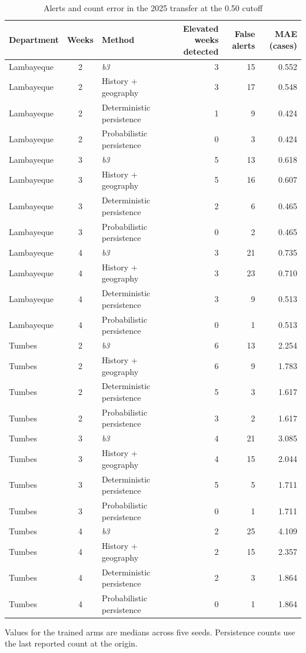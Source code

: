 \documentclass[10pt]{article}
\newcommand{\bthree}{\textit{b3}}
\begin{document}
\begin{table}[!h]
\centering
\caption{Alerts and count error in the 2025 transfer at the 0.50 cutoff}
\small
\begin{tabular}{@{}lclrrr@{}}
\toprule
Department & Weeks & Method & Elevated weeks detected & False alerts & MAE (cases)\\
\midrule
Lambayeque & 2 & \bthree{} & 3 & 15 & 0.552\\
Lambayeque & 2 & History + geography & 3 & 17 & 0.548\\
Lambayeque & 2 & Deterministic persistence & 1 & 9 & 0.424\\
Lambayeque & 2 & Probabilistic persistence & 0 & 3 & 0.424\\
Lambayeque & 3 & \bthree{} & 5 & 13 & 0.618\\
Lambayeque & 3 & History + geography & 5 & 16 & 0.607\\
Lambayeque & 3 & Deterministic persistence & 2 & 6 & 0.465\\
Lambayeque & 3 & Probabilistic persistence & 0 & 2 & 0.465\\
Lambayeque & 4 & \bthree{} & 3 & 21 & 0.735\\
Lambayeque & 4 & History + geography & 3 & 23 & 0.710\\
Lambayeque & 4 & Deterministic persistence & 3 & 9 & 0.513\\
Lambayeque & 4 & Probabilistic persistence & 0 & 1 & 0.513\\
Tumbes & 2 & \bthree{} & 6 & 13 & 2.254\\
Tumbes & 2 & History + geography & 6 & 9 & 1.783\\
Tumbes & 2 & Deterministic persistence & 5 & 3 & 1.617\\
Tumbes & 2 & Probabilistic persistence & 3 & 2 & 1.617\\
Tumbes & 3 & \bthree{} & 4 & 21 & 3.085\\
Tumbes & 3 & History + geography & 4 & 15 & 2.044\\
Tumbes & 3 & Deterministic persistence & 5 & 5 & 1.711\\
Tumbes & 3 & Probabilistic persistence & 0 & 1 & 1.711\\
Tumbes & 4 & \bthree{} & 2 & 25 & 4.109\\
Tumbes & 4 & History + geography & 2 & 15 & 2.357\\
Tumbes & 4 & Deterministic persistence & 2 & 3 & 1.864\\
Tumbes & 4 & Probabilistic persistence & 0 & 1 & 1.864\\
\bottomrule
\end{tabular}

\vspace{2pt}\parbox{0.85\textwidth}{\footnotesize Values for the trained arms are medians across five seeds. Persistence counts use the last reported count at the origin.}
\end{table}
\end{document}
